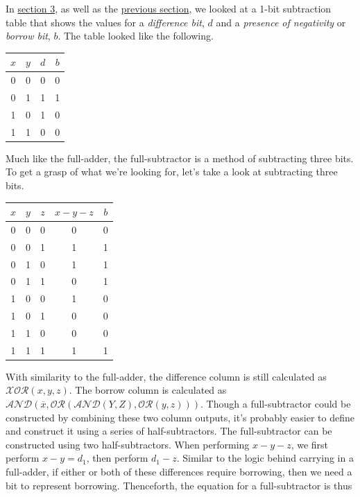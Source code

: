 \documentclass[oneside]{book}
\begin{document}
\tab
In \hyperref[chap:halfsub]{section 3}, as well as the \hyperref[chap:binsub]{previous section}, we looked at a 1-bit subtraction table that shows the values for a \textit{difference bit}, $d$ and a \textit{presence of negativity} or \textit{borrow bit}, $b$. The table looked like the following.
\begin{center}
\begin{tabular}{|c|c|c|c|}
\hline
$x$ & $y$ & $d$ & $b$\\
\hline
0 & 0 & 0 & 0 \\
\hline
0 & 1 & 1 & 1 \\
\hline
1 & 0 & 1 & 0 \\
\hline
1 & 1 & 0 & 0 \\
\hline
\end{tabular}
\end{center}
\tab
Much like the full-adder, the full-subtractor is a method of subtracting three bits. To get a grasp of what we're looking for, let's take a look at subtracting three bits.
\begin{center}
\begin{tabular}{|c|c|c|c|c|}
\hline
$x$ & $y$ & $z$ & $x-y-z$ & $b$\\
\hline
0 & 0 & 0 & 0 & 0\\
0 & 0 & 1 & 1 & 1\\
0 & 1 & 0 & 1 & 1\\
0 & 1 & 1 & 0 & 1\\
1 & 0 & 0 & 1 & 0\\
1 & 0 & 1 & 0 & 0\\
1 & 1 & 0 & 0 & 0\\
1 & 1 & 1 & 1 & 1\\
\hline
\end{tabular}
\end{center}
\tab
With similarity to the full-adder, the difference column is still calculated as $\mathcal{XOR}(x,y,z)$. The borrow column is calculated as $\mathcal{AND}(\overline{x},\mathcal{OR}(\mathcal{AND}(Y,Z),\mathcal{OR}(y,z)))$.
\newline
\tab
Though a full-subtractor could be constructed by combining these two column outputs, it's probably easier to define and construct it using a series of half-subtractors. The full-subtractor can be constructed using two half-subtractors. When performing $x-y-z$, we first perform $x-y=d_1$, then perform $d_1-z$. Similar to the logic behind carrying in a full-adder, if either or both of these differences require borrowing, then we need a bit to represent borrowing. Thenceforth, the equation for a full-subtractor is thus
\end{document}
